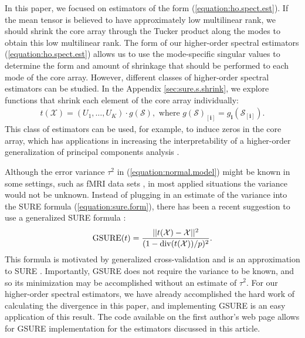 In this paper, we focused on estimators of the form
(\ref{equation:ho.spect.est}). If the mean tensor is believed to have
approximately low multilinear rank, we should shrink the core array
through the Tucker product along the modes to obtain this low
multilinear rank. The form of our higher-order spectral estimators
(\ref{equation:ho.spect.est}) allows us to use the mode-specific
singular values to determine the form and amount of shrinkage that
should be performed to each mode of the core array. However, different
classes of higher-order spectral estimators can be studied. In the
Appendix \ref{sec:sure.s.shrink}, we explore functions that shrink
each element of the core array individually:
\begin{align*}
t(\mathcal{X}) = (U_1,\ldots,U_K)\cdot g(\mathcal{S}), \text{ where } g(\mathcal{S})_{[\mathbf{i}]} = g_{\mathbf{i}}(\mathcal{S}_{[\mathbf{i}]}).
\end{align*}
This class of estimators can be used, for example, to induce zeros in
the core array, which has applications in increasing the
interpretability of a higher-order generalization of principal
components analysis
\citep{henrion1993body,kiers1997uniqueness,murakami1998case,andersson1999general,de2001independent,martin2008jacobi}.

Although the error variance $\tau^2$ in (\ref{equation:normal.model})
might be known in some settings, such as fMRI data sets
\citep{candes2013unbiased}, in most applied situations the variance
would not be unknown. Instead of plugging in an estimate of the
variance into the SURE formula (\ref{equation:sure.form}), there has
been a recent suggestion to use a generalized SURE formula
\citep{sylvain2012smooth,josse2015adaptive}:
\begin{align*}
\operatorname*{GSURE}(t) = \frac{||t(\mathcal{X}) - \mathcal{X}||^2}{(1 - \operatorname*{div}(t(\mathcal{X}))/p)^2}.
\end{align*}
This formula is motivated by generalized cross-validation
\citep{golub1979generalized} and is an approximation to SURE
\citep{josse2015adaptive}. Importantly, GSURE does not require the
variance to be known, and so its minimization may be accomplished
without an estimate of $\tau^2$. For our higher-order spectral
estimators, we have already accomplished the hard work of calculating
the divergence in this paper, and implementing GSURE is an easy
application of this result. The code available on the first author's
web page allows for GSURE implementation for the estimators discussed
in this article.
